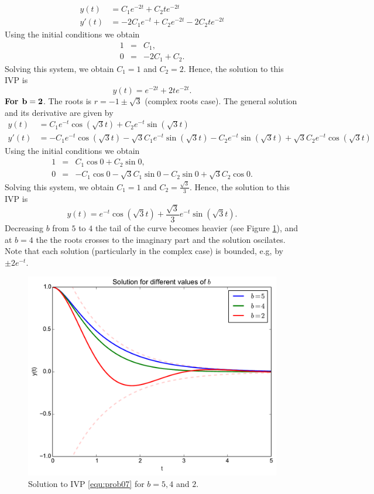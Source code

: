 \documentclass[11pt]{article}
\begin{document}
\begin{solution}
\begin{equation*}
\begin{split}
y(t) &= C_{1} e^{-2t}  + C_{2} te^{-2t} \\
y'(t) &= -2 C_{1} e^{-t} + C_{2}e^{-2t} -2 C_{2} t e^{-2t}
\end{split}
\end{equation*}
Using the initial conditions we obtain
\begin{eqnarray*}
1 &=& C_{1},\\
0 &=& -2C_{1} + C_{2}.
\end{eqnarray*}
Solving this system, we obtain $C_{1} = 1$ and $C_{2} = 2$.
Hence, the solution to this IVP is
\begin{equation*}
\boxed{ y(t) = e^{-2t} +2 t e^{-2t}}.
\end{equation*}
\textbf{For $\bf b=2$}. The roots is $r=-1\pm \sqrt{3}$ (complex roots case).
The general solution and its derivative are given by
\begin{equation*}
\begin{split}
y(t) &= C_{1} e^{-t}\cos(\sqrt{3}t)  + C_{2} e^{-t}\sin(\sqrt{3}t) \\
y'(t) &= - C_{1} e^{-t}\cos(\sqrt{3}t) - \sqrt{3}C_{1} e^{-t}\sin(\sqrt{3}t) - C_{2}e^{-t}\sin(\sqrt{3}t) + \sqrt{3}C_{2}e^{-t}\cos(\sqrt{3}t)
\end{split}
\end{equation*}
Using the initial conditions we obtain
\begin{eqnarray*}
1 &=& C_{1} \cos 0 + C_{2}\sin 0,\\
0 &=& -C_{1} \cos 0 - \sqrt{3}C_{1} \sin 0 - C_{2} \sin 0 + \sqrt{3} C_{2}\cos 0.
\end{eqnarray*}
Solving this system, we obtain $C_{1} = 1$ and $C_{2} = \frac{\sqrt{3}}{3}$.
Hence, the solution to this IVP is
\begin{equation*}
\boxed{ y(t) = e^{-t}\cos(\sqrt{3}t) + \frac{\sqrt{3}}{3} e^{-t}\sin(\sqrt{3}t)}.
\end{equation*}
Decreasing $b$ from $5$ to $4$ the tail of the curve becomes heavier (see Figure \ref{fig:prob07}), and at $b=4$ the the roots crosses to the imaginary part and the solution oscilates. Note that each solution (particularly in the complex case) is bounded, e.g, by $\pm 2e^{-t}$.
\begin{figure}
\begin{center}
\includegraphics[width=0.5\linewidth]{figures/lab02prob07.pdf}
\caption{Solution to IVP \eqref{equ:prob07} for $b=5, 4$ and $2$.}
\label{fig:prob07}
\end{center}

\end{figure}

\end{solution}
\end{document}
